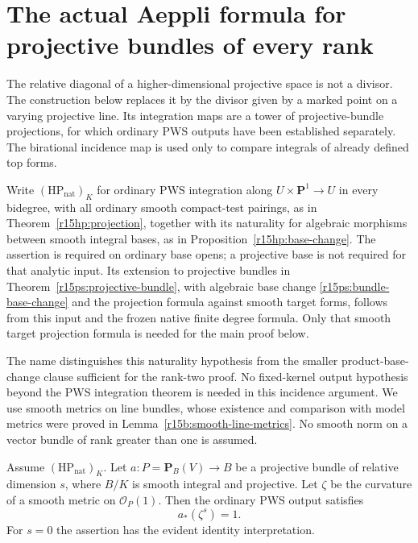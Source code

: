 \section{The actual Aeppli formula for projective bundles of every rank}
\label{r15i:section}

The relative diagonal of a higher-dimensional projective space is not
a divisor.  The construction below replaces it by the divisor given
by a marked point on a varying projective line.  Its integration maps
are a tower of projective-bundle projections, for which ordinary PWS
outputs have been established separately.  The birational incidence
map is used only to compare integrals of already defined top forms.

\begin{definition}
\label{r15i:HPnat}
Write $(\mathrm{HP}_{\mathrm{nat}})_K$ for ordinary PWS integration
along $U\times\mathbf P^1\to U$ in every bidegree, with all ordinary
smooth compact-test pairings, as in Theorem~\ref{r15hp:projection},
together with its naturality for algebraic morphisms between smooth
integral bases, as in Proposition~\ref{r15hp:base-change}.
The assertion is required on ordinary base opens; a projective base
is not required for that analytic input.  Its extension to projective
bundles in Theorem~\ref{r15ps:projective-bundle}, with algebraic
base change \eqref{r15ps:bundle-base-change} and the projection
formula against smooth target forms, follows from this input and
the frozen native finite degree formula.  Only that smooth target
projection formula is needed for the main proof below.
\end{definition}

The name distinguishes this naturality hypothesis from the smaller
product-base-change clause sufficient for the rank-two proof.
No fixed-kernel output hypothesis beyond the PWS integration theorem
is needed in this incidence argument.  We use smooth metrics on line
bundles, whose existence and comparison with model metrics were
proved in Lemma~\ref{r15b:smooth-line-metrics}.  No smooth norm on a
vector bundle of rank greater than one is assumed.

\begin{lemma}
\label{r15i:normalization}
Assume $(\mathrm{HP}_{\mathrm{nat}})_K$.  Let
$a:P=\mathbf P_B(V)\to B$ be a projective bundle of relative
dimension $s$, where $B/K$ is smooth integral and projective.
Let $\zeta$ be the curvature of a smooth metric on
$\mathcal O_P(1)$.  Then the ordinary PWS output satisfies
\[
                         a_*(\zeta^s)=1.
\tag{I15.1}\label{r15i:relative-mass}
\]
For $s=0$ the assertion has the evident identity interpretation.
\end{lemma}

